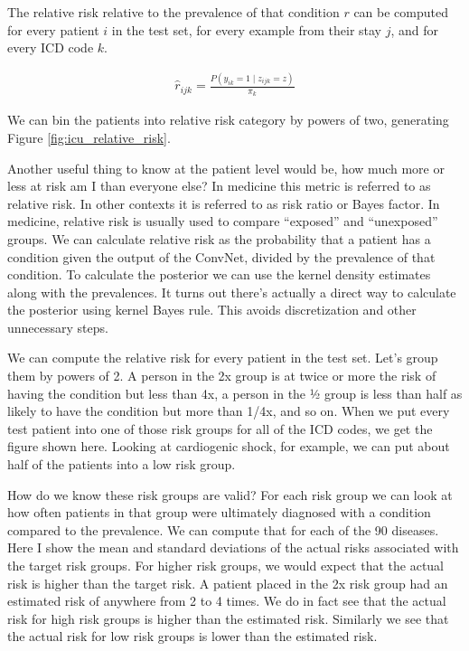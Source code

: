 The relative risk relative to the prevalence of that condition $r$ can be computed for every patient $i$ in the test set, for every example from their stay $j$, and for every ICD code $k$.

\begin{gather}
    \hat{r}_{ijk} = \frac
        {P(y_{ik} = 1 \mid z_{ijk} = z)}
        {\pi_k}
\end{gather}

We can bin the patients into relative risk category by powers of two, generating Figure \ref{fig:icu_relative_risk}.

Another useful thing to know at the patient level would be, how much more or less at risk am I than everyone else?  In medicine this metric is referred to as relative risk.  In other contexts it is referred to as risk ratio or Bayes factor.  In medicine, relative risk is usually used to compare “exposed” and “unexposed” groups.  We can calculate relative risk as the probability that a patient has a condition given the output of the ConvNet, divided by the prevalence of that condition.  To calculate the posterior we can use the kernel density estimates along with the prevalences.  It turns out there’s actually a direct way to calculate the posterior using kernel Bayes rule.  This avoids discretization and other unnecessary steps.

We can compute the relative risk for every patient in the test set.  Let’s group them by powers of 2.  A person in the 2x group is at twice or more the risk of having the condition but less than 4x, a person in the ½ group is less than half as likely to have the condition but more than 1/4x, and so on.  When we put every test patient into one of those risk groups for all of the ICD codes, we get the figure shown here.  Looking at cardiogenic shock, for example, we can put about half of the patients into a low risk group.

\figIcuRelativeRisk

How do we know these risk groups are valid?  For each risk group we can look at how often patients in that group were ultimately diagnosed with a condition compared to the prevalence.  We can compute that for each of the 90 diseases.  Here I show the mean and standard deviations of the actual risks associated with the target risk groups.  For higher risk groups, we would expect that the actual risk is higher than the target risk.  A patient placed in the 2x risk group had an estimated risk of anywhere from 2 to 4 times.  We do in fact see that the actual risk for high risk groups is higher than the estimated risk.  Similarly we see that the actual risk for low risk groups is lower than the estimated risk.

